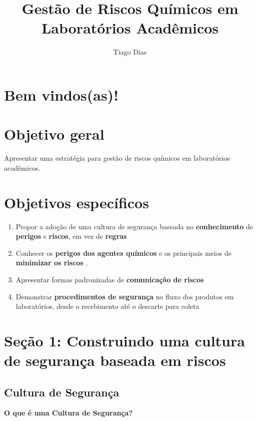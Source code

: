 \documentclass[
  letterpaper,
  DIV=11,
  numbers=noendperiod]{scrartcl}
\title{\textbf{Gestão de Riscos Químicos em Laboratórios Acadêmicos}}
\author{Tiago Dias}
\date{}
\providecommand{\tightlist}{%
  \setlength{\itemsep}{0pt}\setlength{\parskip}{0pt}}\usepackage{longtable,booktabs,array}
\begin{document}
\maketitle


\section{Bem vindos(as)!}\label{bem-vindosas}

\section{Objetivo geral}\label{objetivo-geral}

Apresentar uma estratégia para gestão de riscos químicos em laboratórios
acadêmicos.

\section{Objetivos específicos}\label{objetivos-especuxedficos}

\begin{enumerate}
\def\labelenumi{\arabic{enumi}.}
\tightlist
\item
  Propor a adoção de uma cultura de segurança baseada no
  \textbf{conhecimento} de \textbf{perigos} e \textbf{riscos}, em vez de
  \textbf{regras}
\item
  Conhecer os \textbf{perigos dos agentes químicos} e os principais
  meios de \textbf{minimizar os riscos} .
\item
  Apresentar formas padronizadas de \textbf{comunicação de riscos}
\item
  Demonstrar \textbf{procedimentos de segurança} no fluxo dos produtos
  em laboratórios, desde o recebimento até o descarte para coleta
\end{enumerate}

\section{Seção 1: Construindo uma cultura de segurança baseada em
riscos}\label{seuxe7uxe3o-1-construindo-uma-cultura-de-seguranuxe7a-baseada-em-riscos}

\subsection{Cultura de Segurança}\label{cultura-de-seguranuxe7a}

\textbf{O que é uma Cultura de Segurança?}
\end{document}

